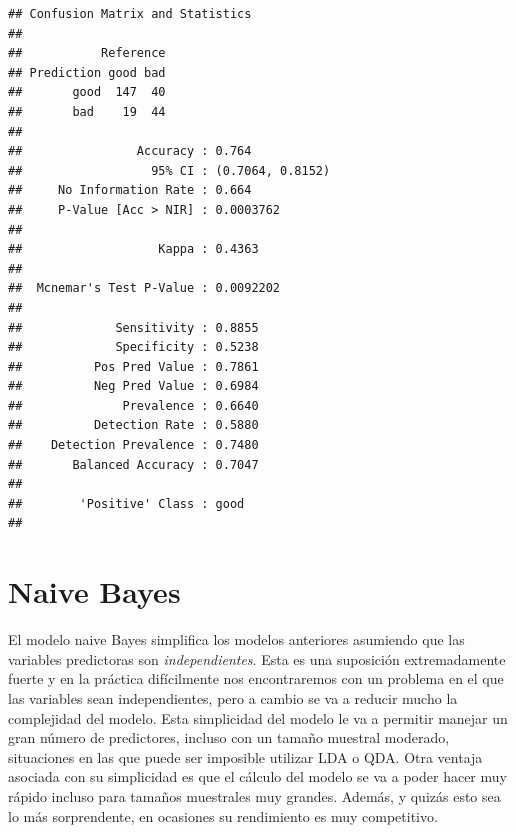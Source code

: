 \documentclass[
  spanish,
]{book}
\newenvironment{Shaded}{\begin{snugshade}}{\end{snugshade}}
\newcommand{\DataTypeTok}[1]{\textcolor[rgb]{0.13,0.29,0.53}{#1}}
\newcommand{\KeywordTok}[1]{\textcolor[rgb]{0.13,0.29,0.53}{\textbf{#1}}}
\newcommand{\NormalTok}[1]{#1}
\newcommand{\OperatorTok}[1]{\textcolor[rgb]{0.81,0.36,0.00}{\textbf{#1}}}
\newcommand{\StringTok}[1]{\textcolor[rgb]{0.31,0.60,0.02}{#1}}
\theoremstyle{break}
\theoremstyle{definition}
\theoremstyle{definition}
\theoremstyle{definition}
\theoremstyle{remark}
\begin{document}
\begin{Shaded}
\end{Shaded}

\begin{verbatim}
## Confusion Matrix and Statistics
## 
##           Reference
## Prediction good bad
##       good  147  40
##       bad    19  44
##                                           
##                Accuracy : 0.764           
##                  95% CI : (0.7064, 0.8152)
##     No Information Rate : 0.664           
##     P-Value [Acc > NIR] : 0.0003762       
##                                           
##                   Kappa : 0.4363          
##                                           
##  Mcnemar's Test P-Value : 0.0092202       
##                                           
##             Sensitivity : 0.8855          
##             Specificity : 0.5238          
##          Pos Pred Value : 0.7861          
##          Neg Pred Value : 0.6984          
##              Prevalence : 0.6640          
##          Detection Rate : 0.5880          
##    Detection Prevalence : 0.7480          
##       Balanced Accuracy : 0.7047          
##                                           
##        'Positive' Class : good            
## 
\end{verbatim}

\begin{Shaded}
\end{Shaded}

\hypertarget{naive-bayes}{%
\section{Naive Bayes}\label{naive-bayes}}

El modelo naive Bayes simplifica los modelos anteriores asumiendo que las variables predictoras son \emph{independientes}. Esta es una suposición extremadamente fuerte y en la práctica difícilmente nos encontraremos con un problema en el que las variables sean independientes, pero a cambio se va a reducir mucho la complejidad del modelo. Esta simplicidad del modelo le va a permitir manejar un gran número de predictores, incluso con un tamaño muestral moderado, situaciones en las que puede ser imposible utilizar LDA o QDA. Otra ventaja asociada con su simplicidad es que el cálculo del modelo se va a poder hacer muy rápido incluso para tamaños muestrales muy grandes. Además, y quizás esto sea lo más sorprendente, en ocasiones su rendimiento es muy competitivo.
\end{document}
